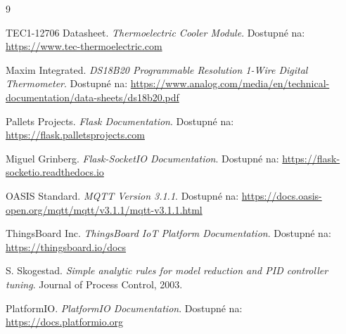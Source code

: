 \begin{thebibliography}{9}

TEC1-12706 Datasheet.
\textit{Thermoelectric Cooler Module}.
Dostupné na: \url{https://www.tec-thermoelectric.com}

Maxim Integrated.
\textit{DS18B20 Programmable Resolution 1-Wire Digital Thermometer}.
Dostupné na: \url{https://www.analog.com/media/en/technical-documentation/data-sheets/ds18b20.pdf}

Pallets Projects.
\textit{Flask Documentation}.
Dostupné na: \url{https://flask.palletsprojects.com}

Miguel Grinberg.
\textit{Flask-SocketIO Documentation}.
Dostupné na: \url{https://flask-socketio.readthedocs.io}

OASIS Standard.
\textit{MQTT Version 3.1.1}.
Dostupné na: \url{https://docs.oasis-open.org/mqtt/mqtt/v3.1.1/mqtt-v3.1.1.html}

ThingsBoard Inc.
\textit{ThingsBoard IoT Platform Documentation}.
Dostupné na: \url{https://thingsboard.io/docs}

S. Skogestad.
\textit{Simple analytic rules for model reduction and PID controller tuning}.
Journal of Process Control, 2003.

PlatformIO.
\textit{PlatformIO Documentation}.
Dostupné na: \url{https://docs.platformio.org}

\end{thebibliography}